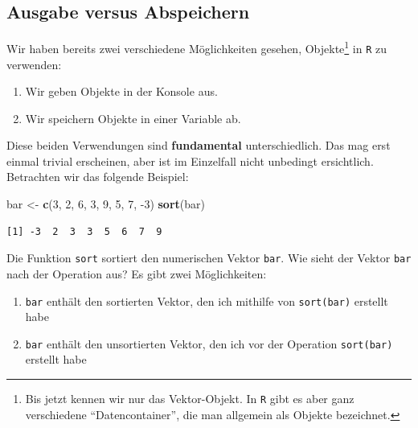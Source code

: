 \documentclass[12pt,]{tufte-book}
\newenvironment{Shaded}{\begin{snugshade}}{\end{snugshade}}
\newcommand{\KeywordTok}[1]{\textcolor[rgb]{0.13,0.29,0.53}{\textbf{#1}}}
\newcommand{\DecValTok}[1]{\textcolor[rgb]{0.00,0.00,0.81}{#1}}
\newcommand{\StringTok}[1]{\textcolor[rgb]{0.31,0.60,0.02}{#1}}
\newcommand{\NormalTok}[1]{#1}
\providecommand{\tightlist}{%
  \setlength{\itemsep}{0pt}\setlength{\parskip}{0pt}}
\theoremstyle{definition}
\theoremstyle{definition}
\theoremstyle{definition}
\theoremstyle{remark}
\begin{document}
\hypertarget{ausgabevsabspeichern}{\subsection{Ausgabe versus
Abspeichern}\label{ausgabevsabspeichern}}

Wir haben bereits zwei verschiedene Möglichkeiten gesehen,
Objekte\footnote{Bis jetzt kennen wir nur das Vektor-Objekt. In
  \texttt{R} gibt es aber ganz verschiedene ``Datencontainer'', die man
  allgemein als Objekte bezeichnet.} in \texttt{R} zu verwenden:

\begin{enumerate}
\def\labelenumi{\arabic{enumi}.}
\tightlist
\item
  Wir geben Objekte in der Konsole aus.
\item
  Wir speichern Objekte in einer Variable ab.
\end{enumerate}

Diese beiden Verwendungen sind \textbf{fundamental} unterschiedlich. Das
mag erst einmal trivial erscheinen, aber ist im Einzelfall nicht
unbedingt ersichtlich. Betrachten wir das folgende Beispiel:

\begin{Shaded}
\begin{Highlighting}[]
\NormalTok{bar <-}\StringTok{ }\KeywordTok{c}\NormalTok{(}\DecValTok{3}\NormalTok{, }\DecValTok{2}\NormalTok{, }\DecValTok{6}\NormalTok{, }\DecValTok{3}\NormalTok{, }\DecValTok{9}\NormalTok{, }\DecValTok{5}\NormalTok{, }\DecValTok{7}\NormalTok{, }\DecValTok{-3}\NormalTok{)}
\KeywordTok{sort}\NormalTok{(bar)}
\end{Highlighting}
\end{Shaded}

\begin{verbatim}
[1] -3  2  3  3  5  6  7  9
\end{verbatim}

Die Funktion \texttt{sort} sortiert den numerischen Vektor \texttt{bar}.
Wie sieht der Vektor \texttt{bar} nach der Operation aus? Es gibt zwei
Möglichkeiten:

\begin{enumerate}
\def\labelenumi{\arabic{enumi}.}
\tightlist
\item
  \texttt{bar} enthält den sortierten Vektor, den ich mithilfe von
  \texttt{sort(bar)} erstellt habe
\item
  \texttt{bar} enthält den unsortierten Vektor, den ich vor der
  Operation \texttt{sort(bar)} erstellt habe
\end{enumerate}
\end{document}
